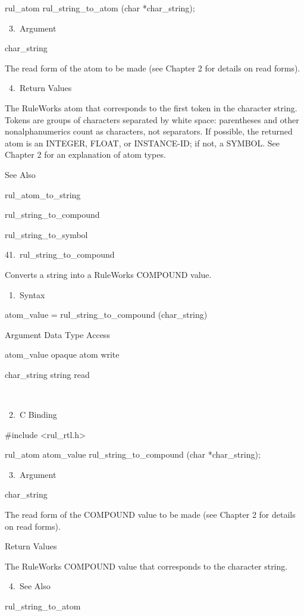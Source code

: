 {          rul_atom rul_string_to_atom (char
          *char_string);

       3. Argument

          char_string

          The read form of the atom to be made
          (see Chapter 2 for details on read
          forms).

       4. Return Values

    The RuleWorks atom that corresponds to the
    first token in the character string.
    Tokens are groups of characters separated
    by white space: parentheses and other
    nonalphanumerics count as characters, not
    separators. If possible, the returned atom
    is an INTEGER, FLOAT, or INSTANCE-ID; if
    not, a SYMBOL. See Chapter 2 for an
    explanation of atom types.

    See Also

    rul_atom_to_string

    rul_string_to_compound

    rul_string_to_symbol

41. rul_string_to_compound

    Converts a string into a RuleWorks
    COMPOUND value.

       1. Syntax

          atom_value = rul_string_to_compound
          (char_string)

          Argument  Data Type    Access

          atom_value  opaque atom   write

          char_string  string    read

           

       2. C Binding

          #include <rul_rtl.h>

          rul_atom atom_value
          rul_string_to_compound (char
          *char_string);

       3. Argument

          char_string

          The read form of the COMPOUND value
          to be made (see Chapter 2 for
          details on read forms).

          Return Values

          The RuleWorks COMPOUND value that
          corresponds to the character string.

       4. See Also

    rul_string_to_atom

}
